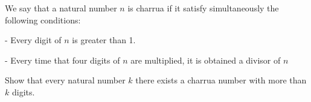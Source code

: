 We say that a natural number $n$ is charrua if it satisfy simultaneously the following conditions:

- Every digit of $n$ is greater than 1.

- Every time that four digits of $n$ are multiplied, it is obtained a divisor of $n$

Show that every natural number $k$ there exists a charrua number with more than $k$ digits.